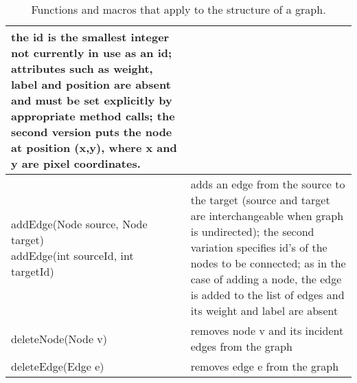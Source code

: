 \begin{table}
\begin{tabular}{| m{} | m{} |}
    the id is the smallest integer not currently in use as an id;
    attributes such as weight, label and position are absent and must be set explicitly
    by appropriate method calls;
    the second version puts the node at position \textsf{(x,y)},
    where \textsf{x} and \textsf{y} are pixel coordinates.
    \\ \hline
    \shortstack[l]{
      \textsf{addEdge(Node source, Node target)}\\
      \textsf{addEdge(int sourceId, int targetId)}
    }
    &
    adds an edge from the source to
    the target (source and target are interchangeable when graph is undirected);
    the second variation specifies id's of the nodes to be connected;
    as in the case of adding a node, the edge is added to the list of edges and
    its weight and label are absent
    \\ \hline
    \textsf{deleteNode(Node v)}
    &
    removes node \textsf{v} and its incident edges from the graph
    \\ \hline
    \textsf{deleteEdge(Edge e)}
    &
    removes edge \textsf{e} from the graph
    \\ \hline
  \end{tabular}
  \caption{Functions and macros that apply to the structure of a graph.}
  \label{tab:graph_functions}
\end{table}
